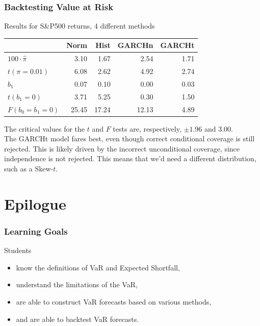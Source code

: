 \begin{frame}%

\frametitle{Backtesting Value at Risk}



\begin{block}{Results for S\&P500 returns, 4 different methods}
\begin{center}
	\begin{tabular}{l|rrrr}
		\toprule
		{} &       Norm &       Hist &     GARCHn &    GARCHt \\
		\midrule
		$100\cdot \hat{\pi}$ &  3.10 &   1.67 &   2.54 &  1.71 \\
		$t(\pi =0.01)$    &   6.08 &   2.62 &   4.92 &  2.74 \\
		$\hat{b}_{1}$   &   0.07 &   0.10 &   0.00 &  0.03 \\
		$t(b_{1}=0)$ &   3.71 &   5.25 &   0.30 &  1.50 \\
		$F(b_{0}=b_{1}=0)$    &  25.45 &  17.24 &  12.13 &  4.89 \\
		\bottomrule
	\end{tabular}
\end{center}
\small The critical values for the $t$ and $F$ tests are, respectively, $\pm 1.96$ and $3.00$.\\
The GARCHt model fares best, even though correct conditional coverage is still rejected. This is likely driven by the incorrect unconditional coverage, since independence is not rejected. This means that we'd need a different distribution, such as a Skew-$t$.
\end{block}
\end{frame}%

\section{Epilogue}
\begin{frame}
\frametitle{Learning Goals}
Students
\begin{itemize}
\item know the definitions of VaR and Expected Shortfall,
\item understand the limitations of the VaR,
\item are able to construct VaR forecasts based on various methods,
\item and are able to backtest VaR forecasts.
\end{itemize}
\end{frame}

